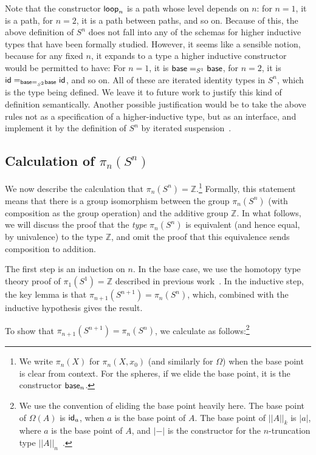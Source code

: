 Note that the constructor $\mathsf{loop}_n$ is a path whose level depends
on $n$: for $n = 1$, it is a path, for $n = 2$, it is a path between
paths, and so on.  Because of this, the above definition of $S^n$ does
not fall into any of the schemas for higher inductive types that have
been formally studied.  However, it seems like a sensible notion,
because for any fixed $n$, it expands to a type a higher inductive
constructor would be permitted to have: For $n = 1$, it is $\mathsf{base}
=_{S^1} \mathsf{base}$, for $n=2$, it is $\mathsf{id} =_{\mathsf{base} =_{S^2}
  \mathsf{base}} \mathsf{id}$, and so on.  All of these are iterated identity
types in $S^n$, which is the type being defined.  We leave it to future
work to justify this kind of definition semantically.  Another
possible justification would be to take the above rules not as a specification of a
higher-inductive type, but as an interface, and implement it by the
 definition of $S^n$ by iterated suspension~\citep[Section 6.5]{uf13hott-book}.  

\subsection{Calculation of $\pi_n(S^n)$}
\label{sec:pinsn}

We now describe the calculation that $\pi_n(S^n) = \mathbb{Z}$.\footnote{We
write $\pi_n(X)$ for $\pi_n(X,x_0)$ (and similarly for $\Omega$) when the
base point is clear from context.  For the spheres, if we elide the base
point, it is
the constructor $\mathsf{base}_n$.}  Formally, this statement means
that there is a group isomorphism between the group $\pi_n(S^n)$ (with
composition as the group operation) and the additive group
$\mathbb{Z}$.  In what follows, we will discuss the proof that the
\emph{type} $\pi_n(S^n)$ is equivalent (and hence equal, by univalence) to the
type $\mathbb{Z}$, and omit the proof that this equivalence sends
composition to addition.   

The
first step is an induction on $n$.  In the base case, we use the
homotopy type theory proof of $\pi_1(S^1) = \mathbb{Z}$ described in
previous work~\citep{ls13pi1s1}.  In the inductive step, the key lemma
is that $\pi_{n+1}(S^{n+1}) = \pi_n(S^n)$, which, combined with the
inductive hypothesis gives the result.  

To show that $\pi_{n+1}(S^{n+1}) = \pi_n(S^n)$, we calculate as
follows:\footnote{We use the convention of eliding the base point
  heavily here.  The base point of $\Omega(A)$ is $\mathsf{id}_a$, when
  $a$ is the base point of $A$.  The base point of $||A||_k$ is $|a|$,
  where $a$ is the base point of $A$, and $|-|$ is the constructor for
  the $n$-truncation type $||A||_n$~\citep[Section 7.3]{uf13hott-book}.}

